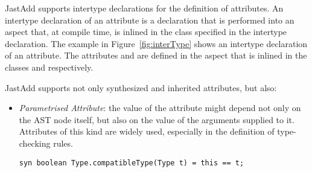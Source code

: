 JastAdd supports intertype declarations for the definition of attributes. An intertype declaration
of an attribute is a declaration that is performed into an aspect that, at compile time, 
is inlined in the class specified in the intertype declaration. The example in Figure~\ref{fig:interType}
shows an intertype declaration of an attribute. 
The attributes  and  are defined in the aspect  
that is inlined in the classes  and  respectively.

JastAdd supports not only synthesized and inherited attributes, but also:
\begin{itemize}
    \item \emph{Parametrised Attribute}: the value of the attribute might depend
    not only on the AST node itself, but also on the value of the arguments supplied
    to it. Attributes of this kind are widely used, especially in the definition of 
    type-checking rules.
    \begin{lstlisting}[language=JastAdd]
        syn boolean Type.compatibleType(Type t) = this == t;
    \end{lstlisting}
    


\end{itemize}
